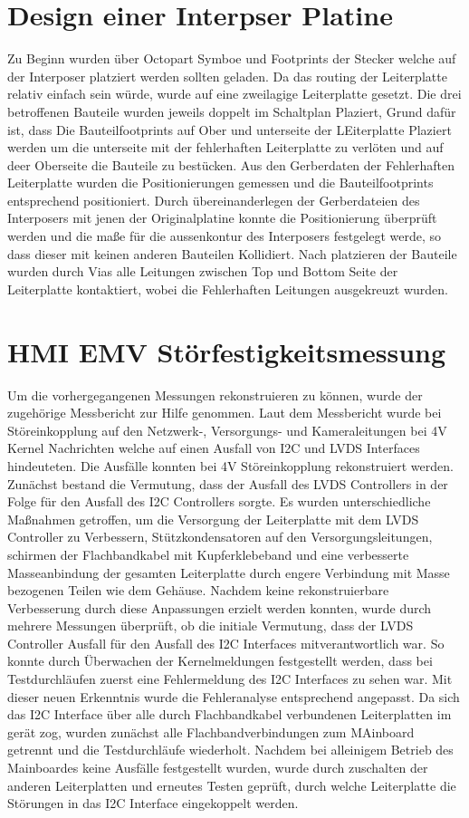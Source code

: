 \documentclass[praktikum,german]{hgbthesis}
\begin{document}
\section{Design einer Interpser Platine}
Zu Beginn wurden über Octopart Symboe und Footprints der Stecker welche auf der Interposer platziert werden sollten geladen. Da das routing der Leiterplatte relativ einfach sein würde, wurde auf eine zweilagige Leiterplatte gesetzt. Die drei betroffenen Bauteile wurden jeweils doppelt im Schaltplan Plaziert, Grund dafür ist, dass Die Bauteilfootprints auf Ober und unterseite der LEiterplatte Plaziert werden um die unterseite mit der fehlerhaften Leiterplatte zu verlöten und auf deer Oberseite die Bauteile zu bestücken. Aus den Gerberdaten der Fehlerhaften Leiterplatte wurden die Positionierungen gemessen und die  Bauteilfootprints entsprechend positioniert. Durch übereinanderlegen der Gerberdateien des Interposers mit jenen der Originalplatine konnte die Positionierung überprüft werden und die maße für die aussenkontur des Interposers festgelegt werde, so dass dieser mit keinen anderen Bauteilen Kollidiert. Nach platzieren der Bauteile wurden durch Vias alle Leitungen zwischen Top und Bottom Seite der Leiterplatte kontaktiert, wobei die Fehlerhaften Leitungen ausgekreuzt wurden.

\section{HMI EMV Störfestigkeitsmessung}
Um die vorhergegangenen Messungen rekonstruieren zu können, wurde der zugehörige Messbericht zur Hilfe genommen. Laut dem Messbericht wurde bei Störeinkopplung auf den Netzwerk-, Versorgungs- und Kameraleitungen bei 4V Kernel Nachrichten welche auf einen Ausfall von I2C und LVDS Interfaces hindeuteten.
Die Ausfälle konnten bei 4V Störeinkopplung rekonstruiert werden. Zunächst bestand die Vermutung, dass der Ausfall des LVDS Controllers in der Folge für den Ausfall des I2C Controllers sorgte. Es wurden unterschiedliche Maßnahmen getroffen, um die Versorgung der Leiterplatte mit dem LVDS Controller zu Verbessern, Stützkondensatoren auf den Versorgungsleitungen, schirmen der Flachbandkabel mit Kupferklebeband und eine verbesserte Masseanbindung der gesamten Leiterplatte durch engere Verbindung mit Masse bezogenen Teilen wie dem Gehäuse. Nachdem keine rekonstruierbare Verbesserung durch diese Anpassungen erzielt werden konnten, wurde durch mehrere Messungen überprüft, ob die initiale Vermutung, dass der LVDS Controller Ausfall für den Ausfall des I2C Interfaces mitverantwortlich war. So konnte durch Überwachen der Kernelmeldungen festgestellt werden, dass bei Testdurchläufen zuerst eine Fehlermeldung des I2C Interfaces zu sehen war. Mit dieser neuen Erkenntnis wurde die Fehleranalyse entsprechend angepasst. Da sich das I2C Interface über alle durch Flachbandkabel verbundenen Leiterplatten im gerät zog, wurden zunächst alle Flachbandverbindungen zum MAinboard getrennt und die Testdurchläufe wiederholt. Nachdem bei alleinigem Betrieb des Mainboardes keine Ausfälle festgestellt wurden, wurde durch zuschalten der anderen Leiterplatten und erneutes Testen geprüft, durch welche Leiterplatte die Störungen in das I2C Interface eingekoppelt werden.
\end{document}
